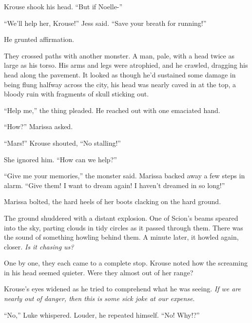Krouse shook his head.  ``But if Noelle-''



``We'll help her, Krouse!''  Jess said.  ``Save your breath for running!''



He grunted affirmation.



They crossed paths with another monster.  A man, pale, with a head twice as large as his torso.  His arms and legs were atrophied, and he crawled, dragging his head along the pavement.  It looked as though he'd sustained some damage in being flung halfway across the city, his head was nearly caved in at the top, a bloody ruin with fragments of skull sticking out.



``Help me,'' the thing pleaded.  He reached out with one emaciated hand.



``How?'' Marissa asked.



``Mars!''  Krouse shouted, ``No stalling!''



She ignored him.  ``How can we help?''



``Give me your memories,'' the monster said.  Marissa backed away a few steps in alarm.  ``Give them!  I want to dream again!  I haven't dreamed in so long!''



Marissa bolted, the hard heels of her boots clacking on the hard ground.



The ground shuddered with a distant explosion.  One of Scion's beams speared into the sky, parting clouds in tidy circles as it passed through them.  There was the sound of something howling behind them.  A minute later, it howled again, closer.  \emph{Is it chasing us?  }



One by one, they each came to a complete stop.  Krouse noted how the screaming in his head seemed quieter.  Were they almost out of her range?



Krouse's eyes widened as he tried to comprehend what he was seeing. \emph{If we are nearly out of danger, then this is some sick joke at our expense}.



``No,'' Luke whispered.  Louder, he repeated himself.  ``No!  Why!?''



